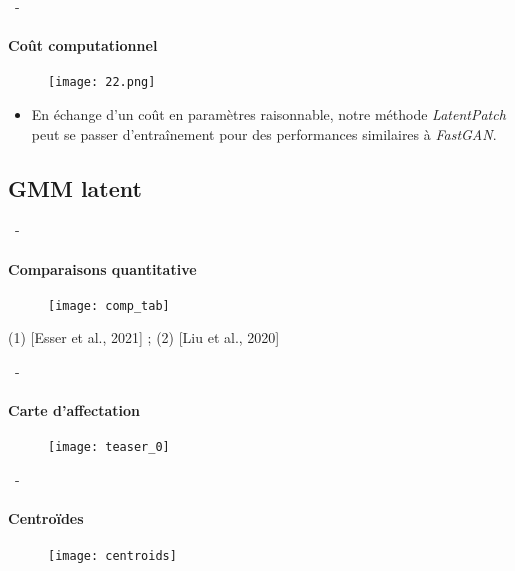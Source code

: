 \documentclass[aspectratio=169, 22pt]{beamer}
\begin{document}
\begin{frame}[noframenumbering]{\secname~- \subsecname}
  \framesubtitle{Coût computationnel}
  \begin{figure}
    \texttt{[image: 22.png]}
  \end{figure}
  \begin{itemize}
  \item En échange d'un coût en paramètres raisonnable, notre méthode
    \emph{LatentPatch} peut se passer d'entraînement pour des performances
    similaires à \emph{FastGAN}.
  \end{itemize}
\end{frame}

\subsection{GMM latent}
\begin{frame}[noframenumbering]{\secname~- \subsecname}
  \framesubtitle{Comparaisons quantitative}
  \begin{figure}
    \texttt{[image: comp\_tab]}
  \end{figure}
  \scriptsize (1) [Esser et al., 2021] ; (2) [Liu et al., 2020]
\end{frame}

\begin{frame}[noframenumbering]{\secname~- \subsecname}
  \framesubtitle{Carte d'affectation}
  \begin{figure}
    \texttt{[image: teaser\_0]}
  \end{figure}
\end{frame}

\begin{frame}[noframenumbering]{\secname~- \subsecname}
  \framesubtitle{Centroïdes}
  \begin{figure}
    \texttt{[image: centroids]}
  \end{figure}
\end{frame}
\end{document}
